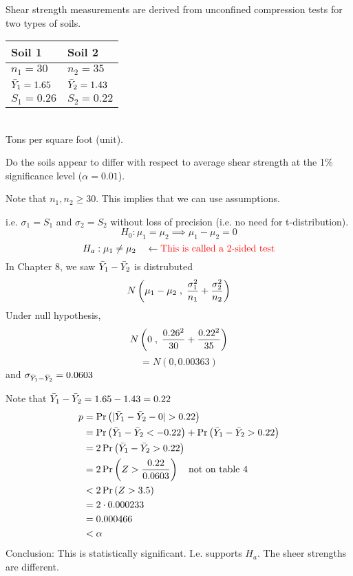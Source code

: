  Shear strength measurements are derived from unconfined compression tests for two types of soils. 
\begin{center}
\begin{tabular}{ | m{3cm}| m{3cm} | } 
    \hline
    \textbf{Soil 1} & \textbf{Soil 2}\\
    \hline
    $n_1 = 30$ & $n_2 = 35$ \\ 
    \hline \vspace{0.1cm}
    $\bar{Y}_1 = 1.65$ & \vspace{0.1cm}$\bar{Y}_2 = 1.43$ \\ 
    \hline
    $S_1 = 0.26$ & $S_2 = 0.22$\\
    \hline
  \end{tabular}
  \\Tons per square foot (unit).
\end{center}
\nl Do the soils appear to differ with respect to average shear strength at the 1\% significance level ($\alpha = 0.01$).

\nl Note that $n_1, n_2 \geq 30$. This implies that we can use  assumptions.

\nl i.e. $\sigma_1 = S_1$ and $\sigma_2 = S_2$ without loss of precision (i.e. no need for t-distribution).
$$H_0 : \mu_1 = \mu_2 \implies \mu_1 - \mu_2 = 0$$
$$H_a : \mu_1 \neq \mu_2 \quad \leftarrow \color{red}{\text{This is called a 2-sided test}}\color{black}$$ 
In Chapter 8, we saw $\bar{Y}_1 - \bar{Y}_2$ is distrubuted
$$N\pars{\mu_1 - \mu_2\;,\; \frac{\sigma_1^2}{n_1} + \frac{\sigma_2^2}{n_2}}$$
Under null hypothesis,
$$N\pars{0\;,\; \frac{0.26^2}{30} + \frac{0.22^2}{35}}$$
$$= N(0, 0.00363)$$
and $\sigma_{\bar{Y}_1 - \bar{Y}_2} = 0.0603$

\nl Note that $\bar{Y}_1 - \bar{Y}_2 = 1.65 - 1.43 = 0.22$
\begin{align*}
    p &= \P{|\Ybar_1 - \Ybar_2 - 0| > 0.22}\\
    &= \P{\Ybar_1 - \Ybar_2 < -0.22} + \P{\Ybar_1 - \Ybar_2 > 0.22}\\
    &= 2\P{\Ybar_1 - \Ybar_2 > 0.22}\\
    &= 2\P{Z > \frac{0.22}{0.0603}} \quad \text{not on table 4}\\
    &< 2\P{Z > 3.5}\\
    &= 2 \cdot 0.000233\\
    &= 0.000466\\
    &< \alpha
\end{align*}
Conclusion: This is statistically significant. I.e. supports $H_a$. The sheer strengths are different.

